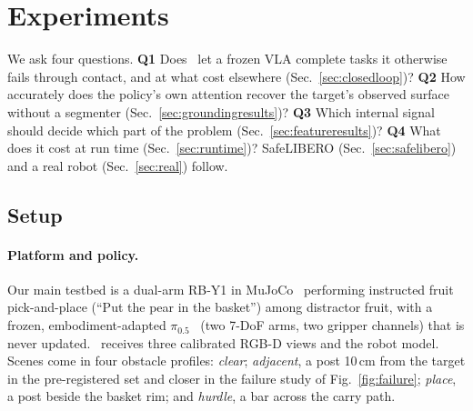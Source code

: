 \section{Experiments}
\label{sec:experiments}
We ask four questions. \textbf{Q1} Does \sys\ let a frozen VLA complete tasks it otherwise fails through contact, and at what cost elsewhere (Sec.~\ref{sec:closedloop})? \textbf{Q2} How accurately does the policy's own attention recover the target's observed surface without a segmenter (Sec.~\ref{sec:groundingresults})? \textbf{Q3} Which internal signal should decide which part of the problem (Sec.~\ref{sec:featureresults})? \textbf{Q4} What does it cost at run time (Sec.~\ref{sec:runtime})? SafeLIBERO (Sec.~\ref{sec:safelibero}) and a real robot (Sec.~\ref{sec:real}) follow.

\subsection{Setup}
\label{sec:setup}
\paragraph{Platform and policy.}
Our main testbed is a dual-arm RB-Y1 in MuJoCo~\cite{todorov2012mujoco} performing instructed fruit pick-and-place (``Put the pear in the basket'') among distractor fruit, with a frozen, embodiment-adapted $\pi_{0.5}$~\cite{intelligence2025pi05} (two 7-DoF arms, two gripper channels) that is never updated. \sys\ receives three calibrated RGB-D views and the robot model. Scenes come in four obstacle profiles: \emph{clear}; \emph{adjacent}, a post 10\,cm from the target in the pre-registered set and closer in the failure study of Fig.~\ref{fig:failure}; \emph{place}, a post beside the basket rim; and \emph{hurdle}, a bar across the carry path.

